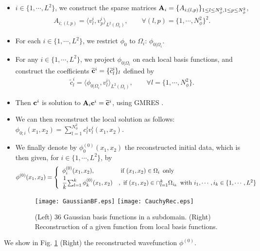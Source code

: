 \begin{itemize}
\item $i \in \{1,\cdots,L^2\}$, we construct the sparse matrices ${\bf A}_{i}=\{A_{i;(l,p)}\}_{1\leq l \leq N_{\phi}^2,1 \leq p\leq N_{\phi}^2}$,
\begin{eqnarray*}
A_{i;(l,p)} = \langle v_{l}^{i},v_p^{i} \rangle_{L^2(\Omega_{i})}, \qquad \forall (l,p)=\{1,\cdots,N^2_{\phi}\}^2.
\end{eqnarray*}
\item For each  $i \in \{1,\cdots,L^2\}$, we restrict $\phi_0$ to $\Omega_{i}$: $\phi_{0|\Omega_{i}}$.
\item For any $i \in \{1,\cdots,L^2\}$, we project $\phi_{0|\Omega_{i}}$ on each local basis functions, and construct the coefficients $\widetilde{{\bf c}}^{i} = \{\widetilde{c}^i_l\}_l$ defined by
\begin{eqnarray*}
\widetilde{c}_l^{i} = \langle \phi_{0|\Omega_{i}},v_{l}^{i} \rangle_{L^2(\Omega_{i})}, \qquad \forall l=\{1,\cdots,N^2_{\phi}\}.
\end{eqnarray*}
\item Then ${\bf c}^{i}$ is solution to ${\bf A}_i{\bf c}^{i} = \widetilde{\bf c}^{i}$, using GMRES \cite{saad}.
\item We can then reconstruct the local solution as follows: $\phi_{0;i}(x_1,x_2)=\sum_{l=1}^{N^2_{\phi}}c^{i}_{l}v_{l}^{i}(x_1,x_2)$.
\item  We finally denote by $\phi^{(0)}_0(x_1,x_2)$ the reconstructed initial data, which is then given, for $i \in \{1,\cdots,L^2\}$,  by
\begin{eqnarray*}
\phi^{(0)}(x_1,x_2) =
\left\{
\begin{array}{ll}
\phi^{(0)}_{i}(x_1,x_2), & \hbox { if } (x_1,x_2)\in \Omega_{i} \, \hbox{ only} \\
\cfrac{1}{k}\sum_{l=1}^{k}\phi^{(0)}_{k}(x_1,x_2)&, \hbox { if } (x_1,x_2) \in \cap_{l=1}^k\Omega_{i_k} \, \hbox{ with } i_1,\cdots,i_k \in \{1,\cdots,L^2\}  
\end{array}
\right.
\end{eqnarray*}
\begin{figure}[!ht]
\begin{center}
\hspace*{1mm}\texttt{[image: GaussianBF.eps]}
\hspace*{1mm}\texttt{[image: CauchyRec.eps]}
\caption{(Left) $36$ Gaussian basis functions in a subdomain. (Right) Reconstruction of a given function from local basis functions.}
\label{CauchyRec}
\end{center}
\end{figure}
\end{itemize}
We show in Fig. \ref{CauchyRec} (Right) the reconstructed wavefunction $\phi^{(0)}$.
